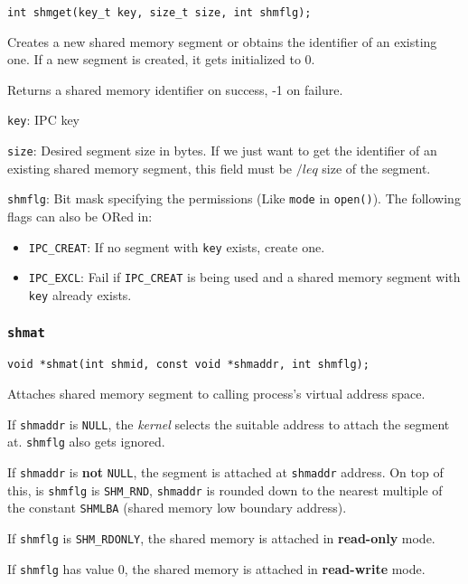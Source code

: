 \documentclass{article}
\begin{document}
\begin{verbatim}
int shmget(key_t key, size_t size, int shmflg);
\end{verbatim}

Creates a new shared memory segment or obtains the identifier of an existing one. If a new segment is created, it gets initialized to 0.

Returns a shared memory identifier on success, -1 on failure.

\texttt{key}: IPC key

\texttt{size}: Desired segment size in bytes. If we just want to get the identifier of an existing shared memory segment, this field must be $/leq$ size of the segment.

\texttt{shmflg}: Bit mask specifying the permissions (Like \texttt{mode} in \texttt{open()}). The following flags can also be ORed in:

\begin{itemize}
    \item \texttt{IPC\_CREAT}: If no segment with \texttt{key} exists, create one.
    \item \texttt{IPC\_EXCL}: Fail if \texttt{IPC\_CREAT} is being used and a shared memory segment with \texttt{key} already exists.
\end{itemize}


\subsubsection{\texttt{shmat}}

\begin{verbatim}
void *shmat(int shmid, const void *shmaddr, int shmflg);
\end{verbatim}

Attaches shared memory segment to calling process's virtual address space.

If \texttt{shmaddr} is \texttt{NULL}, the \textit{kernel} selects the suitable address to attach the segment at. \texttt{shmflg} also gets ignored.

If \texttt{shmaddr} is \textbf{not} \texttt{NULL}, the segment is attached at \texttt{shmaddr} address. On top of this, is \texttt{shmflg} is \texttt{SHM\_RND}, \texttt{shmaddr} is rounded down to the nearest multiple of the constant \texttt{SHMLBA} (shared memory low boundary address).

If \texttt{shmflg} is \texttt{SHM\_RDONLY}, the shared memory is attached in \textbf{read-only} mode.

If \texttt{shmflg} has value 0, the shared memory is attached in \textbf{read-write} mode.
\end{document}
